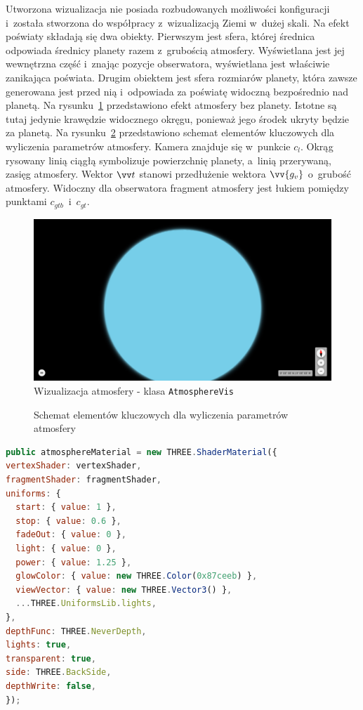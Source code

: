 Utworzona wizualizacja nie posiada rozbudowanych możliwości konfiguracji i~została stworzona do współpracy z~wizualizacją Ziemi w~dużej skali. Na efekt poświaty składają się dwa obiekty. Pierwszym jest sfera, której średnica odpowiada średnicy planety razem z~grubością atmosfery. Wyświetlana jest jej wewnętrzna część i~znając pozycje obserwatora, wyświetlana jest właściwie zanikająca poświata. Drugim obiektem jest sfera rozmiarów planety, która zawsze generowana jest przed nią i~odpowiada za poświatę widoczną bezpośrednio nad planetą. Na rysunku~\ref{fig:c4_atmosphereVis} przedstawiono efekt atmosfery bez planety. Istotne są tutaj jedynie krawędzie widocznego okręgu, ponieważ jego środek ukryty będzie za planetą. Na rysunku~\ref{fig:atmosphere} przedstawiono schemat elementów kluczowych dla wyliczenia parametrów atmosfery. Kamera znajduje się w~punkcie $c_l$. Okrąg rysowany linią ciągłą symbolizuje powierzchnię planety, a~linią przerywaną, zasięg atmosfery. Wektor $\vv t$ stanowi przedłużenie wektora $\vv{g_v}$ o~grubość atmosfery. Widoczny dla obserwatora fragment atmosfery jest łukiem pomiędzy punktami $c_{gtb}$~i~$c_{gt}$.

\begin{figure}
\centering
\includegraphics[width=\linewidth]{img/c4_atmosphereVis.png}
\caption{Wizualizacja atmosfery - klasa \texttt{AtmosphereVis}}
\label{fig:c4_atmosphereVis} 
\end{figure}

\begin{figure}[h]
\centering

\caption{Schemat elementów kluczowych dla wyliczenia parametrów atmosfery}
\label{fig:atmosphere}
\end{figure}

\begin{lstlisting}[float, language=javascript, label={lst:atmosphereVis}, caption={
Fragmenty klasy \texttt{StarsVis}}
]
public atmosphereMaterial = new THREE.ShaderMaterial({
vertexShader: vertexShader,
fragmentShader: fragmentShader,
uniforms: {
  start: { value: 1 },
  stop: { value: 0.6 },
  fadeOut: { value: 0 },
  light: { value: 0 },
  power: { value: 1.25 },
  glowColor: { value: new THREE.Color(0x87ceeb) },
  viewVector: { value: new THREE.Vector3() },
  ...THREE.UniformsLib.lights,
},
depthFunc: THREE.NeverDepth,
lights: true,
transparent: true,
side: THREE.BackSide,
depthWrite: false,
});
\end{lstlisting}

